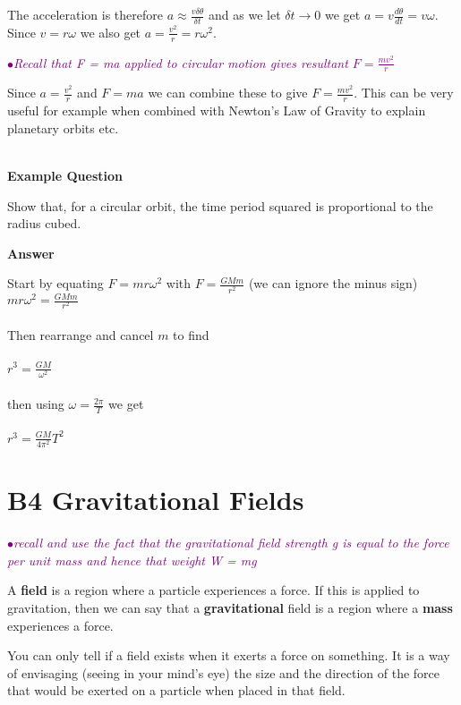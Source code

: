 \documentclass[a4paper,11pt,twoside]{memoir}
\newcounter{spec}[chapter]
\newcommand{\spec}[1]{\Needspace{5\baselineskip}\textcolor{purple}{$\bullet$\hspace{0.5cm}\textit{#1}}}
\newcommand{\answer}{\par \textbf{Answer} \par}
\newenvironment{example}
{\begin{lrbox}{\examplebox}\begin{minipage}{0.9\textwidth}\textbf{Example Question}\par}
{\end{minipage}\end{lrbox}\fbox{\usebox{\examplebox}}}
\begin{document}
The acceleration is therefore $a\approx\frac{v\delta\theta}{\delta t}$ and as we let $\delta t\rightarrow0$ we get $a=v\frac{d\theta}{dt}=v\omega$.
\\
Since $v=r\omega$ we also get $a=\frac{v^2}{r}=r\omega^2$.



\spec{Recall that F = ma applied to circular motion gives resultant $F=\frac{mv^2}{r}$}

Since $a = \frac{v ^{2}}{r}$ and $F=ma$ we can combine these to give $F=\frac{mv^2}{r}$. This can be very useful for example when combined with Newton's Law of Gravity to explain planetary orbits etc.
\\
\\

\begin{example}
	Show that, for a circular orbit, the time period squared is proportional to the radius cubed.

 	\answer Start by equating $F=mr\omega^2$ with $F= \frac{GMm}{r^2}$ (we can ignore the minus sign)
\\

$mr\omega^{2}= \frac{GMm}{r^2}$
\\
\\
Then rearrange and cancel $m$ to find
\\
\\
$r^{3}=\frac{GM}{\omega^2}$
\\
\\
then using $\omega=\frac{2\pi}{T}$ we get
\\
\\
$r^{3}=\frac{GM}{4\pi^{2}}T^2$

\end{example}


\chapter{B4 Gravitational Fields}
\setcounter{spec}{0}
\spec{recall and use the fact that the gravitational field strength g is equal to the force per unit mass and hence that weight W = mg}

A \textbf{field} is a region where a particle experiences a force. If this is applied to gravitation, then we can say that a
\textbf{gravitational} field is a region where a \textbf{mass}
experiences a force.

You can only tell if a field exists when it exerts a force on something.
It is a way of envisaging (seeing in your mind's eye) the size and the
direction of the force that would be exerted on a particle when placed
in that field.
\end{document}
